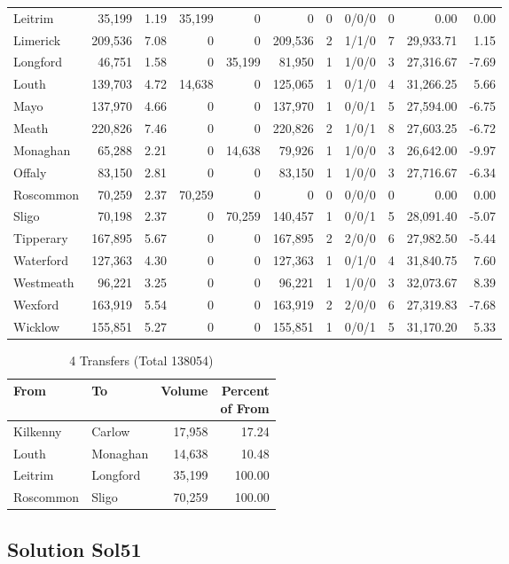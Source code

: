 \documentclass[a4paper]{article}
\begin{document}
\begin{longtable}{lrrrrrrlrrr}
Leitrim&35,199& 1.19&35,199&0&0&0&0/0/0&0& 0.00& 0.00\\ 
Limerick&209,536& 7.08&0&0&209,536&2&1/1/0&7&29,933.71& 1.15\\ 
Longford&46,751& 1.58&0&35,199&81,950&1&1/0/0&3&27,316.67&-7.69\\ 
Louth&139,703& 4.72&14,638&0&125,065&1&0/1/0&4&31,266.25& 5.66\\ 
Mayo&137,970& 4.66&0&0&137,970&1&0/0/1&5&27,594.00&-6.75\\ 
Meath&220,826& 7.46&0&0&220,826&2&1/0/1&8&27,603.25&-6.72\\ 
Monaghan&65,288& 2.21&0&14,638&79,926&1&1/0/0&3&26,642.00&-9.97\\ 
Offaly&83,150& 2.81&0&0&83,150&1&1/0/0&3&27,716.67&-6.34\\ 
Roscommon&70,259& 2.37&70,259&0&0&0&0/0/0&0& 0.00& 0.00\\ 
Sligo&70,198& 2.37&0&70,259&140,457&1&0/0/1&5&28,091.40&-5.07\\ 
Tipperary&167,895& 5.67&0&0&167,895&2&2/0/0&6&27,982.50&-5.44\\ 
Waterford&127,363& 4.30&0&0&127,363&1&0/1/0&4&31,840.75& 7.60\\ 
Westmeath&96,221& 3.25&0&0&96,221&1&1/0/0&3&32,073.67& 8.39\\ 
Wexford&163,919& 5.54&0&0&163,919&2&2/0/0&6&27,319.83&-7.68\\ 
Wicklow&155,851& 5.27&0&0&155,851&1&0/0/1&5&31,170.20& 5.33\\ 
\end{longtable}

\begin{table}[htbp]
\caption{4 Transfers (Total 138054)}
\centering
\begin{tabular}{llrr} \toprule
From &To &Volume &\shortstack{Percent\\of From} \\ \midrule
Kilkenny&Carlow&17,958&17.24\\ 
Louth&Monaghan&14,638&10.48\\ 
Leitrim&Longford&35,199&100.00\\ 
Roscommon&Sligo&70,259&100.00\\ 
\bottomrule
\end{tabular}
\end{table}

\clearpage
\subsection{Solution Sol51}
\end{document}
